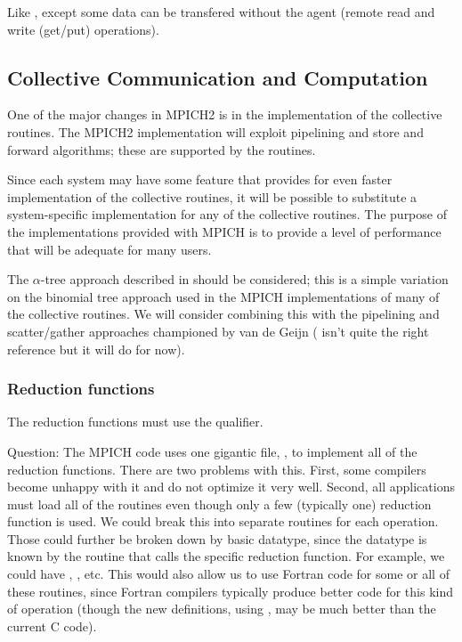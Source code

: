 \documentclass{article}
\begin{document}
\begin{via}
Like \tcpname, except some data can be transfered without the agent
(remote read and write (get/put) operations).
\end{via}

\subsection{Collective Communication and Computation}
One of the major changes in MPICH2 is in the implementation of the
collective routines.  The MPICH2 implementation will exploit
pipelining and store and forward algorithms; these are supported by
the  routines.  

Since each system may have some feature that provides for even faster
implementation of the collective routines, it will be possible to
substitute a system-specific implementation for any of the collective
routines.  The purpose of the implementations provided with MPICH is
to provide a level of performance that will be adequate
for many users.  

The $\alpha$-tree approach described in
\cite{bern:mpi-collective:hpcn99} should be considered; this is a
simple variation on the binomial tree approach used in the MPICH
implementations of many of the collective routines.  We will consider
combining this with the pipelining and scatter/gather approaches
championed by van de Geijn (\cite{vandegeijn} isn't quite the right
reference but it will do for now).

\subsubsection{Reduction functions}
The reduction functions must use the  qualifier.

Question:
The MPICH code uses one gigantic file, , to implement
all of the reduction functions.  There are two problems with this.
First, some compilers become unhappy with it and do not optimize it
very well.  Second, all applications must load all of the routines
even though only a few (typically one) reduction function is used.  We
could break this into separate routines for each operation.  Those
could further be broken down by basic datatype, since the datatype is
known by the routine that calls the specific reduction function.  
For example, we could have ,
, etc.  This would also allow us to use Fortran
code for some or all of these routines, since Fortran compilers
typically produce better code for this kind of operation (though the
new definitions, using , may be much better than the
current C code).
\end{document}
